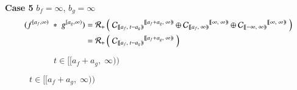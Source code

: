 \textbf{Case 5} $b_f =\infty$, $b_g = \infty$
\begin{align*}
	(f^{[a_f,\infty)} \;*\; g^{[a_g,\infty)})
		= \R[+] &\left( \; 
			{\C[ [\![a_f,\;t-a_g)\!) ]}^{[\![a_f+a_g,\; \infty)\!)} \oplus
			{\C[ [\![a_f,\;\infty)\!) ]}^{[\![\infty,\; \infty)\!)} \oplus
			{\C[ [\![-\infty,\; \infty)\!) ]}^{[\![\infty,\; \infty)\!)} 
		\; \right)\\
		=\R[+] &\left( \; 
			{\C[ [\![a_f,\;t-a_g)\!) ]}^{[\![a_f+a_g,\; \infty)\!)}
		\; \right)
\end{align*}
\vspace{-1.5cm}
\begin{figure}[h]
	\centering
	\begin{subfigure}[h]{0.4\textwidth}
		\caption{$t \in [\![a_f+a_g, \; \infty)\!)$} 
		\centering
	\end{subfigure}
\end{figure}

